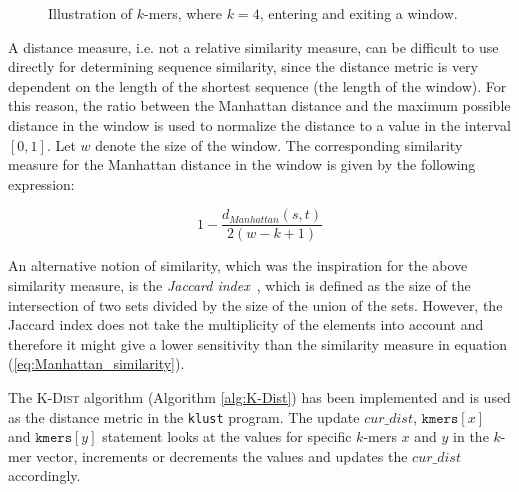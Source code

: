 \begin{figure}[H]
\centering
{}
\caption{Illustration of $k$-mers, where $k=4$, entering and exiting a window.}
\label{fig:d2_forward_differences}
\end{figure}

A distance measure, i.e. not a relative similarity measure, can be difficult to
use directly for determining sequence similarity, since the distance metric is
very dependent on the length of the shortest sequence (the length of the
window). For this reason, the ratio between the Manhattan distance and the
maximum possible distance in the window is used to normalize the distance to a
value in the interval $[0,1]$. Let $w$ denote the size of the window. The
corresponding similarity measure for the Manhattan distance in the window is
given by the following expression:

\begin{equation}
  1 - \frac{d_{Manhattan}(s,t)}{2(w - k + 1)} \label{eq:Manhattan_similarity}
\end{equation}

An alternative notion of similarity, which was the inspiration for the above
similarity measure, is the \emph{Jaccard index}~\cite{jaccard1912}, which is
defined as the size of the intersection of two sets divided by the size of the
union of the sets.  However, the Jaccard index does not take the multiplicity
of the elements into account and therefore it might give a lower sensitivity
than the similarity measure in equation (\ref{eq:Manhattan_similarity}).

The \textsc{K-Dist} algorithm (Algorithm \ref{alg:K-Dist}) has been implemented
and is used as the distance metric in the \texttt{klust} program.  The update
$cur\_dist$, $\mathtt{kmers}[x]$ and $\mathtt{kmers}[y]$ statement looks at the
values for specific $k$-mers $x$ and $y$ in the $k$-mer vector, increments or
decrements the values and updates the $cur\_dist$ accordingly.

